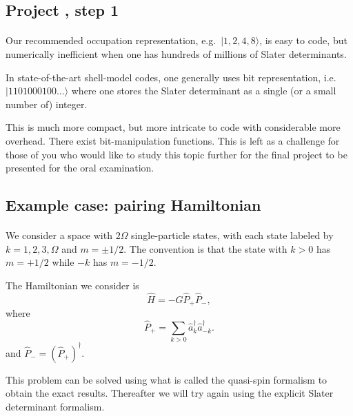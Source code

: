 \documentclass[%
twoside,                 %
final,                   %
10pt]{article}
\begin{document}
\subsection*{Project , step 1}

\paragraph{}

Our recommended occupation representation, e.g.~$| 1,2,4,8 \rangle$, is 
easy to code, but numerically inefficient when one has hundreds of 
millions of Slater determinants.


In state-of-the-art shell-model codes, one generally uses bit 
representation, i.e.~$|1101000100... \rangle$ where one stores 
the Slater determinant as a single (or a small number of) integer.


This is much more compact, but more intricate to code with considerable 
more overhead. There exist 
bit-manipulation functions. 
This is left as a challenge for those of you who would like to study this topic further for the final project to be presented for the oral examination.



\subsection*{Example case: pairing Hamiltonian}

\paragraph{}

We consider a space with $2\Omega$ single-particle states, with each 
state labeled by 
$k = 1, 2, 3, \Omega$ and $m = \pm 1/2$. The convention is that 
the state with $k>0$ has $m = + 1/2$ while $-k$ has $m = -1/2$.


The Hamiltonian we consider is 
\[
\hat{H} = -G \hat{P}_+ \hat{P}_-,
\]
where
\[
\hat{P}_+ = \sum_{k > 0} \hat{a}^\dagger_k \hat{a}^\dagger_{-{k}}.
\]
and $\hat{P}_- = ( \hat{P}_+)^\dagger$.

This problem can be solved using what is called the quasi-spin formalism to obtain the 
exact results. Thereafter we will try again using the explicit Slater determinant formalism.
\end{document}
